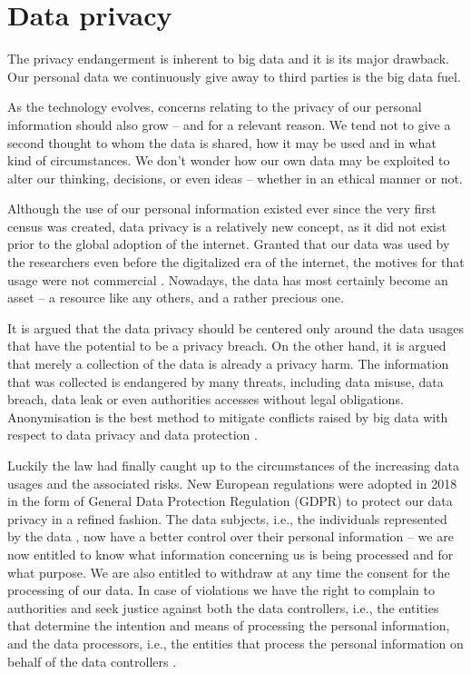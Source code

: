\documentclass[a4paper,twoside,12pt]{book}
\begin{document}
\section{Data privacy}

The privacy endangerment is inherent to big data and it is its major drawback. Our personal data we continuously give away to third parties is the big data fuel.

As the technology evolves, concerns relating to the privacy of our personal information should also grow – and for a relevant reason.  We tend not to give a second thought to whom the data is shared, how it may be used and in what kind of circumstances. We don't wonder how our own data may be exploited to alter our thinking, decisions, or even ideas – whether in an ethical manner or not. 

Although the use of our personal information existed ever since the very first census was created, data privacy is a relatively new concept, as it did not exist prior to the global adoption of the internet. Granted that our data was used by the researchers even before the digitalized era of the internet, the motives for that usage were not commercial \cite{bib:gdpr_handbook}. Nowadays, the data has most certainly become an asset – a resource like any others, and a rather precious one.

It is argued that the data privacy should be centered only around the data usages that have the potential to be a privacy breach. On the other hand, it is argued that merely a collection of the data is already a privacy harm. The information that was collected is endangered by many threats, including data misuse, data breach, data leak or even authorities accesses without legal obligations. Anonymisation is the best method to mitigate conflicts raised by big data with respect to data privacy and data protection \cite{bib:big_data_privacy}.

Luckily the law had finally caught up to the circumstances of the increasing data usages and the associated risks. New European regulations were adopted in 2018 in the form of General Data Protection Regulation (GDPR) to protect our data privacy in a refined fashion. The data subjects, i.e., the individuals represented by the data \cite{bib:anonymization_pipeline}, now have a better control over their personal information – we are now entitled to know what information concerning us is being  processed and for what purpose. We are also entitled to withdraw at any time the consent for the processing of our data. In case of violations we have the right to complain to authorities and seek justice against both the data controllers, i.e., the entities that determine the intention and means of processing the personal information, and the data processors, i.e., the entities that process the personal information on behalf of the data controllers \cite{bib:gdpr_compliance}.
\end{document}
